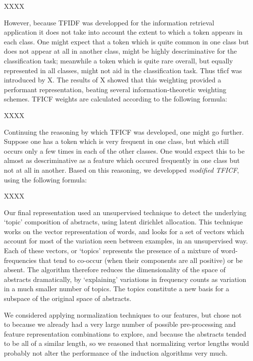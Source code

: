 \documentclass[conference,letterpaper]{IEEEtran}
\begin{document}
XXXX

However, because TFIDF was developped for the information retrieval application
it does not take into account the extent to which a token appears in 
each class.  One might expect that a token which is quite common in one class
but does not appear at all in another class, might be highly descriminative
for the classification task; meanwhile a token which is quite rare overall, 
but equally represented in all classes, might not aid in the classification
task.  Thus tficf was introduced by X.  The results of X showed that 
this weighting provided a performant representation, beating several 
information-theoretic weighting schemes.  TFICF weights are calculated 
according to the following formula:

XXXX

Continuing the reasoning by which TFICF was developed, one might go further.
Suppose one has a token which is very frequent in one class, but which still
occurs only a few times in each of the other classes.  One would expect this
to be almost as descriminative as a feature which occured frequently in one
class but not at all in another.  Based on this reasoning, we developped
\textit{modified TFICF}, using the following formula:

XXXX

Our final representation used an unsupervised technique to detect the
underlying `topic' composition of abstracts, using latent dirichlet allocation.
This technique works on the vector representation of words, and looks for
a set of vectors which account for most of the variation seen between examples,
in an unsupervised way.  Each of these vectors, or `topics' represents the
presence of a mixture of word-frequencies that tend to co-occur (when their
components are all positive) or be absent.  The algorithm therefore reduces
the dimensionality of the space of abstracts dramatically, by `explaining'
variations in frequency counts as variation in a much smaller number of 
topics.  The topics constitute a new basis for a subspace of the original
space of abstracts.

We considered applying normalization techniques to our features, but chose
not to because we already had a very large number of possible pre-processing
and feature representation combinations to explore, and because the abstracts
tended to be all of a similar length, so we reasoned that normalizing vertor 
lengths would probably not alter the performance of the induction algorithms 
very much.
\end{document}
